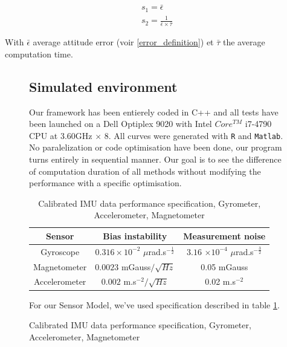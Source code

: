 \begin{align}
s_1 = \bar{\epsilon}\\
s_2 = \frac{1}{\bar{\epsilon} \times \bar{\tau}}
\label{score}
\end{align}

With $\bar{\epsilon}$ average attitude error (voir \ref{error_definition}) et $\bar{\tau}$ the average computation time. \\
\begin{figure}[!h]


\subsection{Simulated environment}

Our framework has been entierely coded in C++ and all tests have been launched on a Dell Optiplex 9020 with Intel $ Core^{TM}$ i7-4790 CPU at 3.60GHz $\times$ 8.  All curves were generated with \texttt{R} and \texttt{Matlab}. No paralelization or code optimisation have been done, our program turns entirely in sequential manner. Our goal is to see the difference of computation duration of all methods without modifying the performance with a specific optimisation.

\begin{table}
\begin{tabular}{|c|c|c|}
\hline
Sensor & Bias instability  & Measurement noise\rule[-2pt]{0pt}{10pt} \\
\hline
\hline
 Gyroscope & $0.316\times 10^{-2} $  $\mu$rad.s$^{-\frac{1}{2}}$ & $ 3.16$ $ \times 10^{-4} $ $\mu$rad.s$^{-\frac{3}{2}}$ \rule[-1.5pt]{0pt}{13pt}\\
 \hline
Magnetometer & $0.0023$ mGauss$/\sqrt{Hz}$ & 0.05 mGauss  \rule[-1.5pt]{0pt}{13pt}\\
 \hline
Accelerometer &  $0.002$ m.s$^{-2}/\sqrt{Hz} $ & 0.02 m.s$^{-2}$ \rule[-1.5pt]{0pt}{13pt}\\
 \hline
\end{tabular}
\caption{Calibrated IMU data performance specification, Gyrometer, Accelerometer, Magnetometer}
\label{spec_imu}
\end{table}

For our Sensor Model, we've used  specification described in table \ref{spec_imu}. 


\end{figure}
